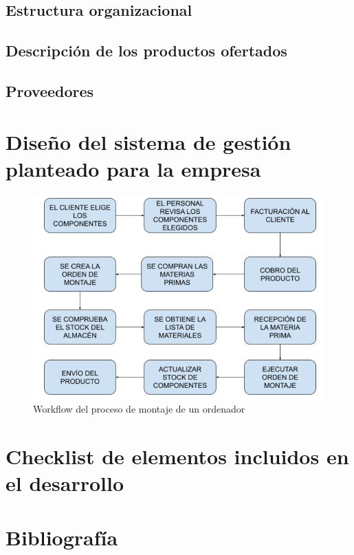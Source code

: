 \documentclass[12pt, letterpaper]{article}
\begin{document}
\subsection{Estructura organizacional}

\subsection{Descripción de los productos ofertados}

\subsection{Proveedores}

\section{Diseño del sistema de gestión planteado para la empresa}
\begin{figure}[ht]
    \includegraphics[width=\textwidth]{workflow.png}
    \caption{\textsf{Workflow del proceso de montaje de un ordenador}}
    \label{workflow}
\end{figure}

\section{Checklist de elementos incluidos en el desarrollo}

\section{Bibliografía}

\end{document}

